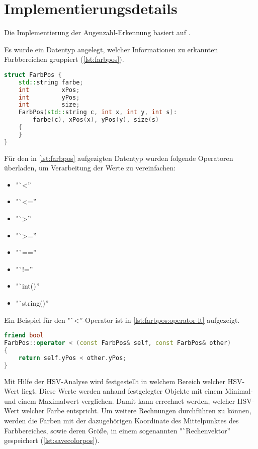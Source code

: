     \section{Implementierungsdetails}

        Die Implementierung der Augenzahl-Erkennung basiert auf
        \cite{github:motboc}.

        Es wurde ein Datentyp angelegt, welcher Informationen zu erkannten
        Farbbereichen gruppiert (\ref{lst:farbpos}).

\begin{lstlisting}[language=c++,
                   caption={Typ: "`FarbPos''},
                   label={lst:farbpos}]
struct FarbPos {
    std::string farbe;
    int         xPos;
    int         yPos;
    int         size;
    FarbPos(std::string c, int x, int y, int s):
        farbe(c), xPos(x), yPos(y), size(s)
    {
    }
}
\end{lstlisting}

        Für den in \autoref{lst:farbpos} aufgezigten Datentyp wurden folgende
        Operatoren überladen, um Verarbeitung der Werte zu vereinfachen:
        \begin{itemize}
            \item "`<''
            \item "`<=''
            \item "`>''
            \item "`>=''
            \item "`==''
            \item "`!=''
            \item "`int()''
            \item "`string()''
        \end{itemize}

        Ein Beispiel für den "`<''-Operator ist in
        \autoref{lst:farbpos:operator-lt} aufgezeigt.

\begin{lstlisting}[language=c++,
                   caption={Beispiel: Implementation "`FarbPos::operator<''},
                   label={lst:farbpos:operator-lt}]
friend bool
FarbPos::operator < (const FarbPos& self, const FarbPos& other)
{
    return self.yPos < other.yPos;
}
\end{lstlisting}

        Mit Hilfe der \ac{HSV}-Analyse wird festgestellt in welchem Bereich
        welcher \ac{HSV}-Wert liegt.
        Diese Werte werden anhand festgelegter Objekte mit einem Minimal- und
        einem Maximalwert verglichen.
        Damit kann errechnet werden, welcher \ac{HSV}-Wert welcher Farbe
        entspricht.
        Um weitere Rechnungen durchführen zu können, werden die Farben mit der
        dazugehörigen Koordinate des Mittelpunktes des Farbbereiches, sowie
        deren Größe, in einem sogenannten "`Rechenvektor'' gespeichert
        (\autoref{lst:savecolorpos}).

